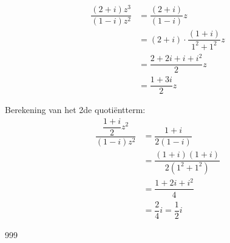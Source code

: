 \documentclass[a4paper]{article}
\begin{document}
\begin{align*}
    \dfrac{\left(2 + i\right)z^3}{\left(1 - i\right)z^2}    &= \dfrac{\left(2 + i\right)}{\left(1 - i\right)} z                 \\
                                                            &= \left(2 + i\right) \cdot \dfrac{\left(1 + i\right)}{1^2 + 1^2}z  \\
                                                            &= \dfrac{2 + 2i + i + i^2}{2}z                                     \\
                                                            &= \dfrac{1 + 3i}{2}z
\end{align*}

Berekening van het 2de quotiëntterm:\\

\begin{align*}
    \dfrac{\dfrac{1+i}{2}z^2}{\left(1 - i\right)z^2}        &= \dfrac{1 + i}{2\left(1 - i\right)}                                       \\
                                                            &= \dfrac{\left(1 + i\right)\left(1 + i\right)}{2\left(1^2 + 1^2\right)}    \\
                                                            &= \dfrac{1 + 2i + i^2}{4}                                                  \\
                                                            &= \dfrac{2}{4}i = \dfrac{1}{2}i
\end{align*}

\begin{thebibliography}{999}
\end{thebibliography}
\end{document}
